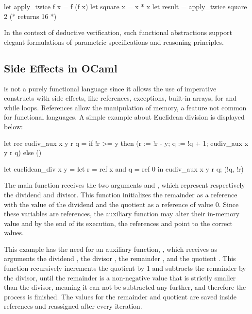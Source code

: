 \begin{ocamlenv}
  let apply_twice f x = f (f x)
  let square x = x * x
  let result = apply_twice square 2  (* returns 16 *)
\end{ocamlenv}

In the context of deductive verification, such functional abstractions support elegant formulations of parametric specifications 
and reasoning principles.

\subsection{Side Effects in OCaml}
\label{subsec:SideEffects}

\ocaml is not a purely functional language since it allows the use of imperative constructs with side effects, like references,
exceptions, built-in arrays, for and while loops. References allow the manipulation of memory, a feature not common for functional
languages. A simple example about Euclidean division is displayed below:

\begin{ocamlenv}
let rec eudiv_aux x y r q =
  if !r >= y then (r := !r - y; q := !q + 1; eudiv_aux x y r q)
  else ()

let euclidean_div x y =
    let r = ref x and q = ref 0 in 
  eudiv_aux x y r q;
  (!q, !r)
\end{ocamlenv}

The main function  receives the two arguments  and , which represent respectively
the dividend and divisor. This function initializes the remainder  as a reference with the value of the dividend 
 and the quotient  as a reference of value 0. Since these variables are references, the auxiliary function
may alter their in-memory value and by the end of its execution, the references  and  point to the correct 
values.

This example has the need for an auxiliary function, , which receives as arguments the dividend 
, the divisor , the remainder , and the quotient . This function recursively
increments the quotient by 1 and subtracts the remainder by the divisor, until the remainder 
is a non-negative value that is strictly smaller than the divisor, meaning it can not be subtracted any further, and therefore the 
process is finished. The values for the remainder and quotient are saved inside references and reassigned after every iteration.

